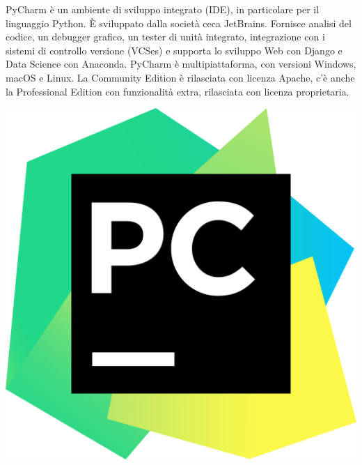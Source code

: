 \documentclass[twoside]{supsistudent}
\begin{document}
\bigskip
\noindent
\begin{minipage}[H]{0.49\textwidth} 
  \begin{flushleft}
    PyCharm è un ambiente di sviluppo integrato (IDE), in particolare per il linguaggio Python. 
    È sviluppato dalla società ceca JetBrains. Fornisce analisi del codice, un debugger grafico, un tester di unità integrato, 
    integrazione con i sistemi di controllo versione (VCSes) e supporta lo sviluppo Web con Django e Data Science con Anaconda.
    PyCharm è multipiattaforma, con versioni Windows, macOS e Linux. La Community Edition è rilasciata con licenza Apache, c'è anche la Professional Edition con funzionalità extra, 
    rilasciata con licenza proprietaria.
  \end{flushleft}
  \end{minipage}
\hfill
\begin{minipage}[H]{0.49\textwidth}
  \begin{center}
    \includegraphics[scale=0.1]{images/PyCharm.png}
  \end{center}
\end{minipage}
\end{document}
